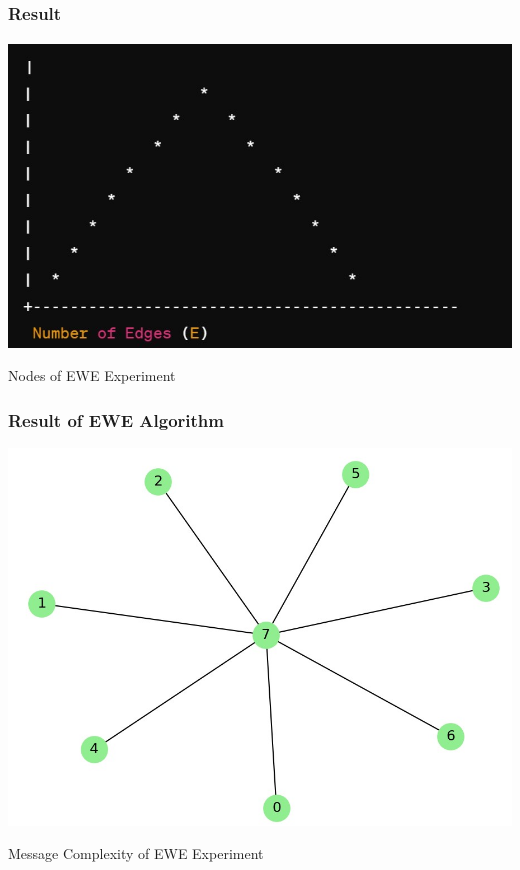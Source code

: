 \documentclass[11pt]{beamer}              %
\begin{document}
\begin{frame}
\frametitle{Result}
\framesubtitle{}

    \centering
    \includegraphics[scale=0.4]{figures/Screen31.jpg}
    \caption{Nodes of EWE Experiment}
    \label{fig:Message Complexity}

\end{frame}


\begin{frame}
\frametitle{Result of EWE Algorithm}
\begin{itemize}
    \centering
    \includegraphics[scale=0.4]{figures/Screen32.jpg}
    \caption{Message Complexity of EWE Experiment}
    \label{fig:Message Complexity}   
\end{itemize}
\end{frame}
\end{document}
